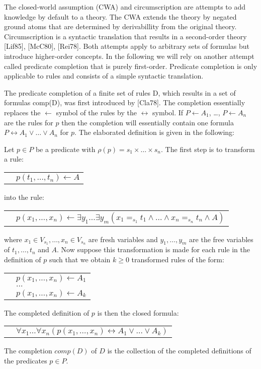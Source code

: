 The closed-world assumption (CWA) and circumscription are attempts to add knowledge by default
to a theory. The CWA extends the theory by negated ground atoms that are determined by derivabillity 
from the original theory. Circumscription is a syntactic translation that results in a second-order 
theory [Lif85], [McC80], [Rei78]. Both attempts apply to arbitrary sets of formulas but introduce 
higher-order concepts. In the following we will rely on another attempt called predicate completion 
that is purely first-order. Predicate completion is only applicable to rules and consists of a 
simple syntactic translation.

The predicate completion of a finite set of rules D, which results in a set of formulas comp(D), 
was first introduced by [Cla78]. The completion essentially replaces the $\leftarrow$ symbol 
of the rules by the $\leftrightarrow$ symbol. If $P\leftarrow A_1$, \ldots, $P \leftarrow A_n$ 
are the rules for $p$ then the completion will essentially contain one formula $P \leftrightarrow 
A_1 \vee \ldots \vee A_n$ for $p$. The elaborated definition is given in the following:

\begin{Def} Let $p \in P$ be a predicate with $\rho(p) = s_1 \times 
\ldots \times s_n$. The first step is to transform a rule:

\begin{tabular}{ll}
\quad & $p(t_1,\ldots,t_n) \leftarrow A$
\end{tabular}

into the rule:

\begin{tabular}{ll}
\quad & $p(x_1,\ldots,x_n) \leftarrow \exists y_1 \ldots 
\exists y_m(x_1 =_{s_1} t_1 \wedge \ldots \wedge x_n =_{s_n} t_n \wedge A)$
\end{tabular}

where $x_1\in V_{s_1}, \ldots, x_n \in V_{s_n}$ are fresh variables and $y_1, \ldots, y_m$ 
are the free variables of $t_1, \ldots, t_n$ and $A$. Now suppose this transformation is 
made for each rule in the definition of $p$ such that we obtain $k\geq 0$ transformed rules of 
the form:

\begin{tabular}{ll}
\quad & $p(x_1,\ldots,x_n) \leftarrow A_1$ \\
\quad & $\ldots$ \\
\quad & $p(x_1,\ldots,x_n) \leftarrow A_k$
\end{tabular}

The completed definition of $p$ is then the closed formula:

\begin{tabular}{ll}
\quad & $\forall x_1 \ldots \forall x_n (p(x_1,\ldots,x_n) 
\leftrightarrow A_1 \vee \ldots \vee A_k)$
\end{tabular}

The completion $comp(D)$ of $D$ is the collection of the completed definitions of 
the predicates $p \in P$.
\end{Def}

